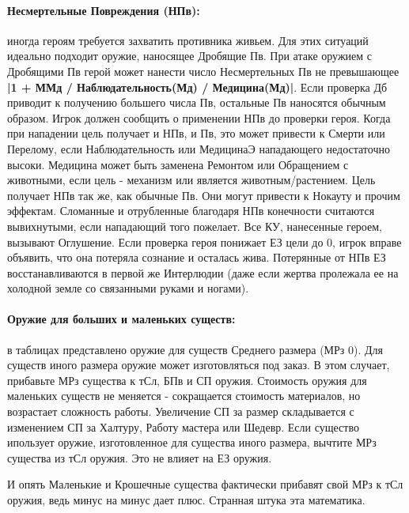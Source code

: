 \paragraph{Несмертельные Повреждения (НПв):} иногда героям требуется захватить противника живьем. Для этих ситуаций идеально подходит оружие, наносящее Дробящие Пв. 
\newline При атаке оружием с Дробящими Пв герой может нанести число Несмертельных Пв не превышающее \textbf{|1 + ММд / Наблюдательность(Мд) / Медицина(Мд)|}. Если проверка Дб приводит к получению большего числа Пв, остальные Пв наносятся обычным образом. Игрок должен сообщить о применении НПв до проверки героя.
\newline Когда при нападении цель получает и НПв, и Пв, это может привести к Смерти или Перелому, если Наблюдательность или  МедицинаЭ нападающего недостаточно высоки.
\newline Медицина может быть заменена Ремонтом или Обращением с животными, если цель - механизм или является животным/растением.
\newline Цель получает НПв так же, как обычные Пв. Они могут привести к Нокауту и прочим эффектам. Сломанные и отрубленные благодаря НПв конечности считаются вывихнутыми, если нападающий того пожелает. Все КУ, нанесенные героем, вызывают Оглушение. Если проверка героя понижает ЕЗ цели до 0, игрок вправе объявить, что она потеряла сознание и осталась жива. Потерянные от НПв ЕЗ восстанавливаются в первой же Интерлюдии (даже если жертва пролежала ее на холодной земле со связанными руками и ногами).

\paragraph{Оружие для больших и маленьких существ:} в таблицах представлено оружие для существ Среднего размера (МРз 0). Для существ иного размера оружие может изготовляться под заказ. 
\newline В этом случает, прибавьте МРз существа к тСл, БПв и СП оружия. Стоимость оружия для маленьких существ не меняется - сокращается стоимость материалов, но возрастает сложность работы. Увеличение СП за размер складывается с изменением СП за Халтуру, Работу мастера или Шедевр.
\newline Если существо ипользует оружие, изготовленное для существа иного размера, вычтите МРз существа из тСл оружия. Это не влияет на ЕЗ оружия.
\begin{tcolorbox}
    И опять Маленькие и Крошечные существа фактически прибавят свой МРз к тСл оружия, ведь минус на минус дает плюс. Странная штука эта математика.
\end{tcolorbox}

